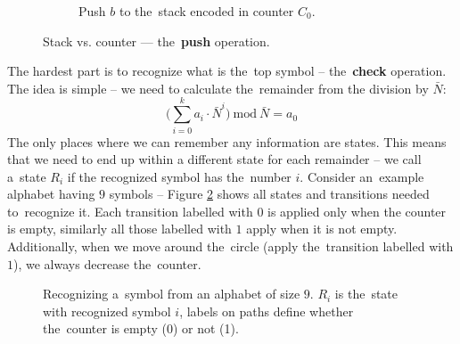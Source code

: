 \documentclass[english,shortabstract,mgr]{iithesis}
\begin{document}
\begin{figure}[H]
\begin{subfigure}[b]{0.6\textwidth}
\begin{tikzpicture}[stack/.style={rectangle split, rectangle split parts=#1,draw, anchor=center}]
    \end{tikzpicture}

    \captionsetup{font=footnotesize}
    \caption{Push $b$ to the~stack encoded in counter $C_0$.}

  \end{subfigure}

  \caption{Stack vs. counter --- the~\textbf{push} operation.}
  \label{fig:push_operation}

\end{figure}


The hardest part is to recognize what is the~top symbol -- the~\textbf{check} operation.
The idea is simple -- we need to calculate the~remainder from the division by $\bar{N}$:
$$ \Bigg( \sum_{i=0}^{k} a_i \cdot \bar{N}^i \Bigg) \ \mathrm{mod} \ \bar{N} = a_0 $$
The only places where we can remember any information are states. This means that we need
to end up within a different state for each remainder -- we call a~state $R_i$ if
the recognized symbol has the~number $i$. Consider an~example alphabet having $9$ symbols -- Figure
\ref{fig:check} shows all states and transitions needed to~recognize it. Each
transition labelled with $0$ is applied only when the counter is empty, similarly
all those labelled with $1$ apply when it is not empty. Additionally, when we move around
the~circle (apply the~transition labelled with $1$), we always decrease the~counter.

\begin{figure}[H]
\centering
{}

\caption{Recognizing a~symbol from an alphabet of size $9$. $R_i$ is the~state with recognized
  symbol $i$, labels on paths define whether the~counter is empty (0) or not (1).}
\label{fig:check}

\end{figure}
\end{document}
